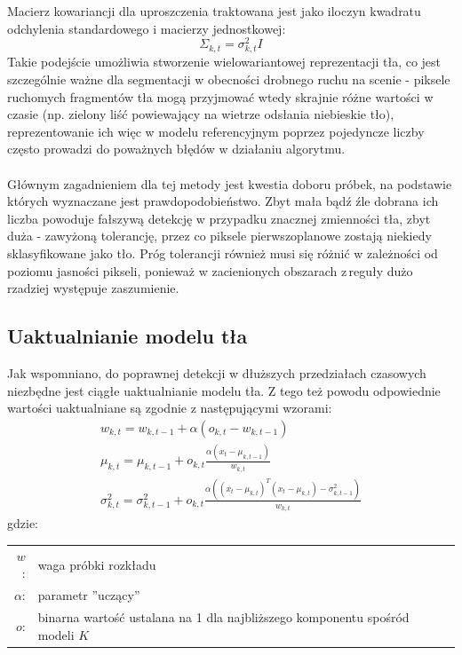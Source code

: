 Macierz kowariancji dla uproszczenia traktowana jest jako iloczyn kwadratu odchylenia standardowego i macierzy jednostkowej:
\begin{equation}
\Sigma_{k,t}=\sigma_{k,t}^2I
\end{equation}
Takie podejście umożliwia stworzenie wielowariantowej reprezentacji tła, co jest szczególnie ważne dla segmentacji w obecności drobnego ruchu na scenie - piksele ruchomych fragmentów tła mogą przyjmować wtedy skrajnie różne wartości w czasie (np. zielony liść powiewający na wietrze odsłania niebieskie tło), reprezentowanie ich więc w modelu referencyjnym poprzez pojedyncze liczby często prowadzi do poważnych błędów w działaniu algorytmu. 
\paragraph{}
Głównym zagadnieniem dla tej metody jest kwestia doboru próbek, na podstawie których wyznaczane jest prawdopodobieństwo. Zbyt mała bądź źle dobrana ich liczba powoduje fałszywą detekcję w przypadku znacznej zmienności tła, zbyt duża - zawyżoną tolerancję, przez co piksele pierwszoplanowe zostają niekiedy sklasyfikowane jako tło. Próg tolerancji również musi się różnić w zależności od poziomu jasności pikseli, ponieważ w zacienionych obszarach z\,reguły dużo rzadziej występuje zaszumienie.
\subsection{Uaktualnianie modelu tła}
Jak wspomniano, do poprawnej detekcji w dłuższych przedziałach czasowych niezbędne jest ciągłe uaktualnianie modelu tła. Z tego też powodu odpowiednie wartości uaktualniane są zgodnie z następującymi wzorami:
\begin{gather}
w_{k,t} = w_{k,t-1}+\alpha(o_{k,t}-w_{k,t-1}) \\
\mu_{k,t} = \mu_{k,t-1}+o_{k,t}\frac{\alpha (x_{t}-\mu_{k,t-1})}{w_{k,t}} \\
\sigma^2_{k,t} = \sigma^2_{k,t-1}+o_{k,t}\frac{\alpha ((x_{t}-\mu_{k,t})^{T}(x_{t}-\mu_{k,t})-\sigma^2_{k,t-1})}{w_{k,t}}
\end{gather}
gdzie:\\ 
\hspace*{3em}
\begin{tabular}{r l}
$w$: & waga próbki rozkładu \\
$\alpha$: &  parametr ''uczący'' \\
$o$: & binarna wartość ustalana na 1 dla najbliższego komponentu spośród modeli $K$
\end{tabular} \\


